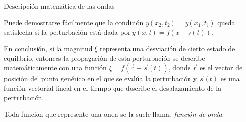 \documentclass[11pt,handout,aspectratio=1610]{beamer}
\newcommand{\vs}{\vspace{11pt}}
\begin{document}
\begin{frame}{Descripción matemática de las ondas}

    Puede demostrarse fácilmente que la condición $ y(x_2,t_2) = y(x_1,t_1) $ queda satisfecha si la perturbación está dada por $y(x,t) = f(x-s(t))$.

    \vs

    En conclusión, si la magnitud $\xi$ representa una desviación de cierto estado de equilibrio, entonces la propagación de esta perturbación se describe matemáticamente con una función $\xi = f(\vec{r}-\vec{s}(t))$, donde $\vec{r}$ es el vector de posición del punto genérico en el que se evalúa la perturbación y $\vec{s}(t)$ es una función vectorial lineal en el tiempo que describe el desplazamiento de la perturbación. 
    
    \vs

    Toda función que represente una onda se la suele llamar \emph{función de onda}.
     
\end{frame}
\end{document}
